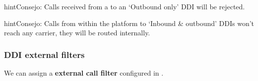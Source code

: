 \documentclass[letterpaper,10pt,spanish]{sphinxmanual}
\begin{document}
\begin{notice}{hint}{Consejo:}
Calls received from a {\hyperref[administration_portal/brand/providers/ddi_providers:ddi\string-providers]{}} to an `Outbound only'
DDI will be rejected.
\end{notice}

\begin{notice}{hint}{Consejo:}
Calls from within the platform to `Inbound \& outbound' DDIs won't reach
any carrier, they will be routed internally.
\end{notice}


\subsubsection{DDI external filters}
\label{administration_portal/client/vpbx/ddis:ddi-external-filters}
We can assign a \textbf{external call filter} configured in {\hyperref[administration_portal/client/vpbx/routing_tools/external_call_filters:external\string-call\string-filters]{}}.
\end{document}

